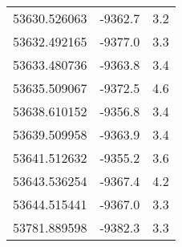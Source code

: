 \begin{table}
\begin{tabular}{l l l}
53630.526063	 & -9362.7	 & 3.2\\
53632.492165	 & -9377.0	 & 3.3\\
53633.480736	 & -9363.8	 & 3.4\\
53635.509067	 & -9372.5	 & 4.6\\
53638.610152	 & -9356.8	 & 3.4\\
53639.509958	 & -9363.9	 & 3.4\\
53641.512632	 & -9355.2	 & 3.6\\
53643.536254	 & -9367.4	 & 4.2\\
53644.515441	 & -9367.0	 & 3.3\\
53781.889598	 & -9382.3	 & 3.3\\
\hline
\end{tabular} 
\end{table}